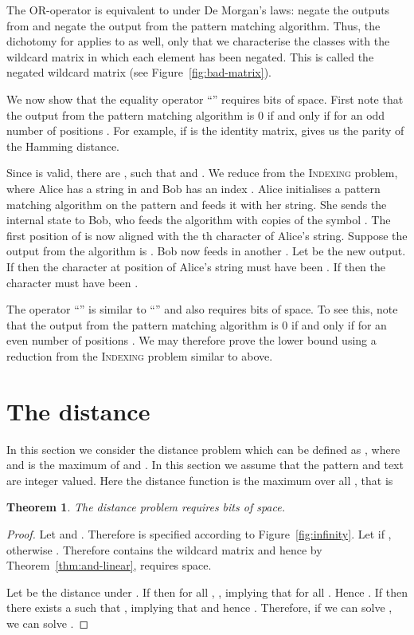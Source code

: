 \documentclass{article}
\newcommand{\indexing}{\textsc{Indexing}\xspace}
\theoremstyle{plain}
\newtheorem{theorem}{Theorem}[]
\theoremstyle{definition}
\begin{document}
The OR-operator  is equivalent to  under De Morgan's laws: negate the outputs from  and negate the output from the pattern matching algorithm. Thus, the dichotomy for  applies to  as well, only that we characterise the classes with the wildcard matrix in which each element has been negated. This is called the negated wildcard matrix (see Figure~\ref{fig:bad-matrix}).

We now show that the equality operator ``'' requires  bits of space. First note that the output from the pattern matching algorithm is 0 if and only if  for an odd number of positions . For example, if  is the identity matrix,  gives us the parity of the Hamming distance.

Since  is valid, there are ,  such that  and . We reduce from the \indexing problem, where Alice has a string in  and Bob has an index . Alice initialises a pattern matching algorithm on the pattern  and feeds it with her string. She sends the internal state to Bob, who feeds the algorithm with  copies of the symbol . The first position of  is now aligned with the th character of Alice's string. Suppose the output from the algorithm is . Bob now feeds in another . Let  be the new output. If  then the character at position  of Alice's string must have been . If  then the character must have been .

The operator ``'' is similar to ``'' and also requires  bits of space. To see this, note that the output from the pattern matching algorithm is 0 if and only if  for an even number of positions . We may therefore prove the lower bound using a reduction from the \indexing problem similar to above.


\section{The  distance}\label{sec:infty}

In this section we consider the  distance problem which can be defined as , where  and  is the maximum of  and . In this section we assume that the pattern and text are integer valued. Here the distance function is the maximum  over all , that is


\begin{theorem}
    \label{thm:maximum}
    The  distance problem requires  bits of space.
\end{theorem}
\begin{proof}
    Let  and . Therefore  is specified according to Figure~\ref{fig:infinity}. Let  if ,
    otherwise . Therefore  contains the wildcard
    matrix and hence by Theorem~\ref{thm:and-linear},  requires  space.

    Let  be the distance under . If  then for all , , implying that  for all . Hence . If  then there exists a  such that , implying that  and hence . Therefore, if we can solve , we can solve .
\end{proof}
\end{document}
